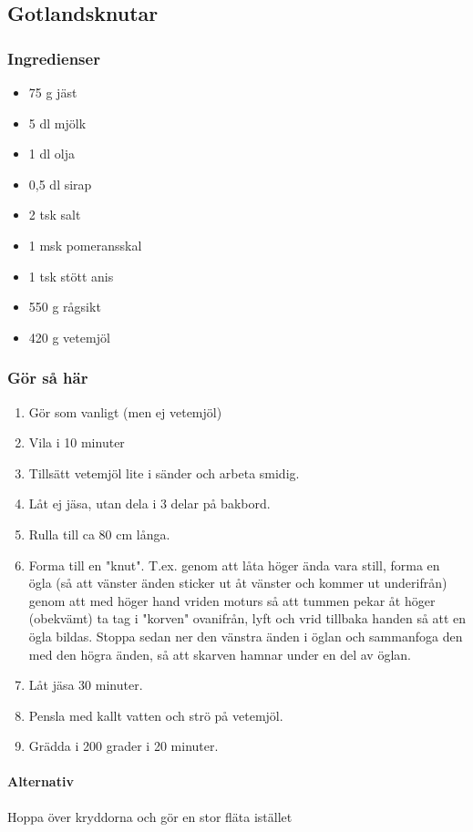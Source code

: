 \documentclass[a4paper,11pt,twocolumn]{article}
\begin{document}
\subsection{Gotlandsknutar}
\subsubsection*{Ingredienser}
\begin{itemize}[noitemsep]
    \item 75 g jäst
    \item 5 dl mjölk
    \item 1 dl olja
    \item 0,5 dl sirap
    \item 2 tsk salt
    \item 1 msk pomeransskal
    \item 1 tsk stött anis
    \item 550 g rågsikt
    \item 420 g vetemjöl
\end{itemize}
\subsubsection*{Gör så här}
\begin{enumerate}[label=\arabic*.]
    \item Gör som vanligt (men ej vetemjöl)
    \item Vila i 10 minuter
    \item Tillsätt vetemjöl lite i sänder och arbeta smidig.
    \item Låt ej jäsa, utan dela i 3 delar på bakbord.
    \item Rulla till ca 80 cm långa.
    \item Forma till en "knut". T.ex. genom att låta höger ända vara still, forma en ögla (så att vänster änden sticker ut åt vänster och kommer ut underifrån) genom att med höger hand vriden moturs så att tummen pekar åt höger (obekvämt) ta tag i "korven" ovanifrån, lyft och vrid tillbaka handen så att en ögla bildas. Stoppa sedan ner den vänstra änden i öglan och sammanfoga den med den högra änden, så att skarven hamnar under en del av öglan.
    \item Låt jäsa 30 minuter.
    \item Pensla med kallt vatten och strö på vetemjöl.
    \item Grädda i 200 grader i 20 minuter.
\end{enumerate}
\paragraph*{Alternativ}
Hoppa över kryddorna och gör en stor fläta istället
\end{document}
